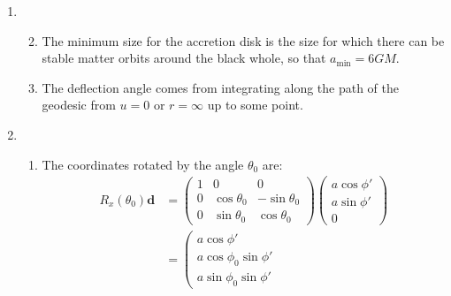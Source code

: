 \documentclass[12pt,a4]{article}
\begin{document}
\begin{enumerate}
\begin{enumerate}
    \end{enumerate}
  \item 
    \begin{enumerate}
      \setcounter{enumii}{1}
        \item
          The minimum size for the accretion disk is the size for which there can be stable matter orbits around the black whole, so that $a_{\min} = 6GM$.
      \setcounter{enumii}{4}
        \item
          The deflection angle comes from integrating along the path of the geodesic from $u = 0$ or $r = \infty$ up to some point.
    \end{enumerate}
  \item
    \begin{enumerate}
      \item
        The coordinates rotated by the angle $\theta_0$ are:
        \begin{align*}
          R_x(\theta_0) \mathbf{d} 
            &=  
                \left(
                \begin{matrix}
                  1 & 0 & 0\\
                  0 & \cos \theta_0 & -\sin \theta_0\\
                  0 & \sin \theta_0 & \cos \theta_0
                \end{matrix}
                \right)
                \left(
                \begin{matrix}
                  a \cos\phi' \\
                  a \sin \phi' \\
                  0 
                \end{matrix}
                \right)\\
            &= 
                \left(
                \begin{matrix}
                  a \cos\phi' \\
                  a \cos \phi_0 \sin \phi' \\
                  a \sin \phi_0 \sin \phi '
                \end{matrix}

\end{align*}
\end{enumerate}
\end{enumerate}
\end{document}
